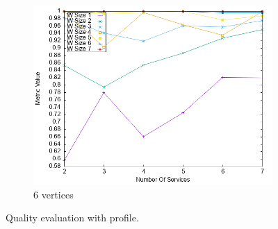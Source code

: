 \begin{figure}[ht]
  \begin{subfigure}{0.33\textwidth}
    \includegraphics[width=\textwidth]{Images/graphs/newwindow_quality_performance_diff_perce_n7_s7_20_100_n7}
    \caption{6 vertices}
    \label{fig:quality_window_perce_wide_7n}
  \end{subfigure}
  \caption{ Quality evaluation with \wide profile.}
  \label{fig:quality_window_perce_wide}
\end{figure}


